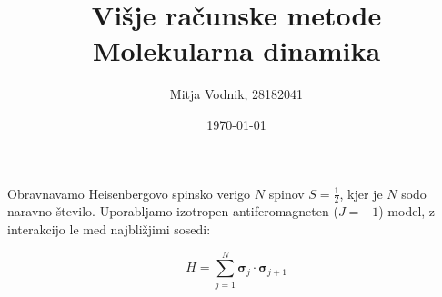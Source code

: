 \documentclass[a4paper]{article}
\newcommand{\half}{\frac{1}{2}}
\newcommand{\pauli}{\mathbf{\sigma}}
\begin{document}
    \title{\sc\large Višje računske metode\\
		\bigskip
		\bf\Large Molekularna dinamika}
	\author{Mitja Vodnik, 28182041}
	\date{\today}
	\maketitle

    Obravnavamo Heisenbergovo spinsko verigo $N$ spinov $S = \half$, kjer je $N$ sodo naravno število.
    Uporabljamo izotropen antiferomagneten ($J = -1$) model, z interakcijo le med najbližjimi sosedi:

    \begin{equation}\label{eq1}
        H = \sum_{j=1}^{N} \pauli_j \cdot \pauli_{j+1}
    \end{equation}

    \iffalse
    \begin{figure}
        \centering
        \texttt{[image: slika1.pdf]}
        \caption{Avtokorelacijska funkcija spinskega toka.}
        \label{slika1}
    \end{figure}
    \fi
\end{document}
